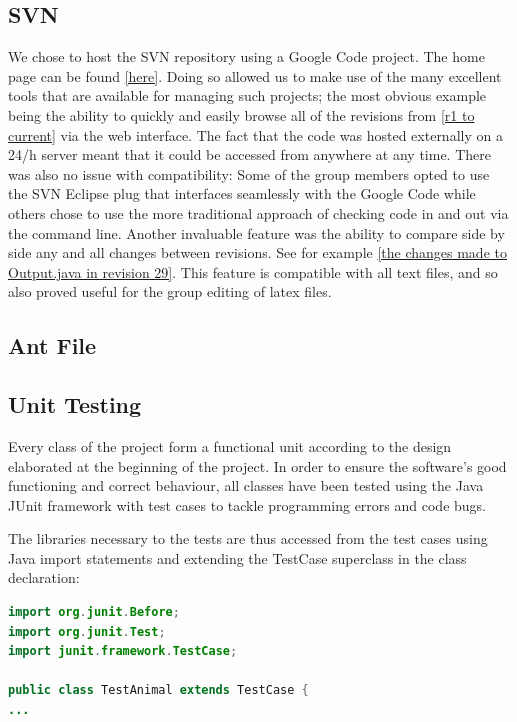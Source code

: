 \documentclass[11pt]{report}
\begin{document}
      \subsection{SVN} %
	We chose to host the SVN repository using a Google Code project. The home page can be found \href{http://code.google.com/p/ps-predator-prey/}{[here]}. Doing so allowed us to make use of the many excellent tools that are available for managing such projects; the most obvious example being the ability to quickly and easily browse all of the revisions from \href{http://code.google.com/p/ps-predator-prey/source/list}{[r1 to current]} via the web interface.  The fact that the code was hosted externally on a 24/h server meant that it could be accessed from anywhere at any time. There was also no issue with compatibility: Some of the group members opted to use the SVN Eclipse plug that interfaces seamlessly with the Google Code while others chose to use the more traditional approach of checking code in and out via the command line. Another invaluable feature was the ability to compare side by side any and all changes between revisions. See for example \href{http://code.google.com/p/ps-predator-prey/source/diff?spec=svn29&r=29&format=side&path=/code/Output.java}{[the changes made to Output.java in revision 29]}. This feature is compatible with all text files, and so also proved useful for the group editing of latex files.  	      
      
      \subsection{Ant File} %
      \subsection{Unit Testing} %
      Every class of the project form a functional unit according to the design elaborated at the beginning of the project. In order to ensure the software's good functioning and correct behaviour, all classes have been tested using the Java JUnit framework with test cases to tackle programming errors and code bugs.

The libraries necessary to the tests are thus accessed from the test cases using Java import statements and extending the TestCase superclass in the class declaration:
\begin{lstlisting}[language=Java,caption= Test case headers]
import org.junit.Before;
import org.junit.Test;
import junit.framework.TestCase;

public class TestAnimal extends TestCase {
...
\end{lstlisting}
\end{document}
